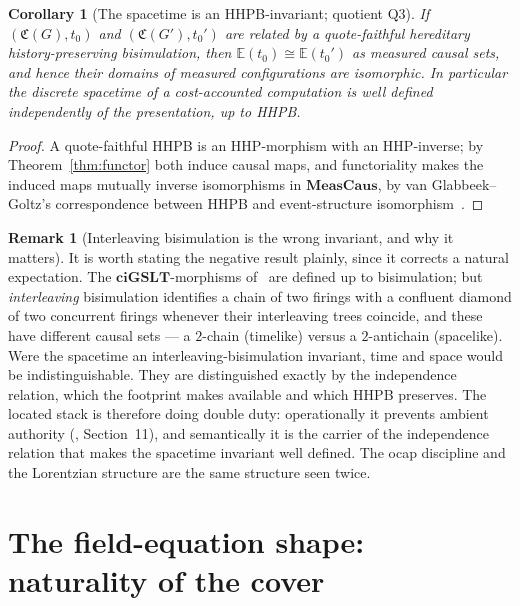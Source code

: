 \documentclass[11pt]{article}
\theoremstyle{definition}
\newtheorem{remark}[definition]{Remark}
\theoremstyle{plain}
\newtheorem{corollary}[definition]{Corollary}
\newcommand{\ciGSLT}{\mathbf{ciGSLT}}
\newcommand{\Cost}{\mathfrak{C}}
\newcommand{\Ev}{\mathbb{E}}
\newcommand{\MeasCaus}{\mathbf{MeasCaus}}
\theoremstyle{remark}
\begin{document}
\begin{corollary}[The spacetime is an HHPB-invariant; quotient $\mathrm{Q3}$]
\label{cor:invariance}
If $(\Cost(G), t_0)$ and $(\Cost(G'), t_0')$ are related by a
quote-faithful hereditary history-preserving bisimulation, then
$\Ev(t_0) \cong \Ev(t_0')$ as measured causal sets, and hence their
domains of measured configurations are isomorphic. In particular the
discrete spacetime of a cost-accounted computation is well defined
independently of the presentation, up to HHPB.
\end{corollary}

\begin{proof}
A quote-faithful HHPB is an HHP-morphism with an HHP-inverse; by
Theorem~\ref{thm:functor} both induce causal maps, and functoriality
makes the induced maps mutually inverse isomorphisms in $\MeasCaus$, by
van Glabbeek--Goltz's correspondence between HHPB and event-structure
isomorphism~\cite{vGG}.
\end{proof}

\begin{remark}[Interleaving bisimulation is the wrong invariant, and why it matters]
It is worth stating the negative result plainly, since it corrects a
natural expectation. The $\ciGSLT$-morphisms of~\cite{CostNote} are
defined up to bisimulation; but \emph{interleaving} bisimulation
identifies a chain of two firings with a confluent diamond of two
concurrent firings whenever their interleaving trees coincide, and these
have different causal sets --- a $2$-chain (timelike) versus a
$2$-antichain (spacelike). Were the spacetime an interleaving-bisimulation
invariant, time and space would be indistinguishable. They are
distinguished exactly by the independence relation, which the footprint
makes available and which HHPB preserves. The located stack is therefore
doing double duty: operationally it prevents ambient authority
(\cite{CostNote}, Section~11), and semantically it is the carrier of the
independence relation that makes the spacetime invariant well defined. The
ocap discipline and the Lorentzian structure are the same structure seen
twice.
\end{remark}

\section{The field-equation shape: naturality of the cover}
\label{sec:naturality}
\end{document}

